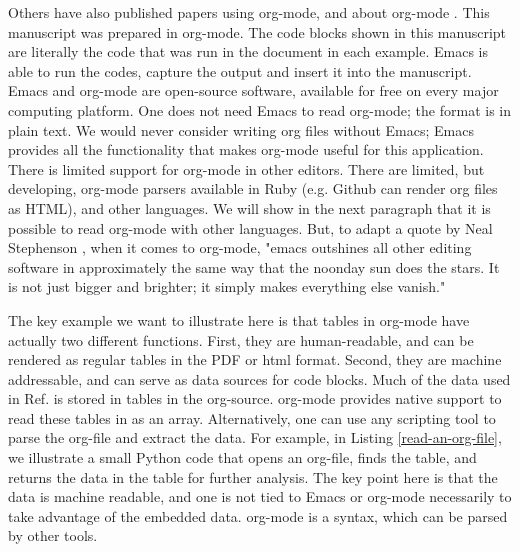 \documentclass[journal=accacs,manuscript=article,email=true]{achemso}
\begin{document}
Others have also published papers using org-mode, and about org-mode \cite{schulte-2011-activ-docum,schulte-2012-multi-languag}. This manuscript was prepared in org-mode. The code blocks shown in this manuscript are literally the code that was run in the document in each example. Emacs is able to run the codes, capture the output and insert it into the manuscript. Emacs and org-mode are open-source software, available for free on every major computing platform. One does not need Emacs to read org-mode; the format is in plain text. We would never consider writing org files without Emacs; Emacs provides all the functionality that makes org-mode useful for this application. There is limited support for org-mode in other editors. There are limited, but developing, org-mode parsers available in Ruby (e.g. Github can render org files as HTML), and other languages. We will show in the next paragraph that it is possible to read org-mode with other languages. But, to adapt a quote by Neal Stephenson \cite{Stephenson199911}, when it comes to org-mode, "emacs outshines all other editing software in approximately the same way that the noonday sun does the stars. It is not just bigger and brighter; it simply makes everything else vanish."

The key example we want to illustrate here is that tables in org-mode have actually two different functions.  First, they are human-readable, and can be rendered as regular tables in the PDF or html format. Second, they are machine addressable, and can serve as data sources for code blocks. Much of the data used in Ref.  is stored in tables in the org-source. org-mode provides native support to read these tables in as an array. Alternatively, one can use any scripting tool to parse the org-file and extract the data. For example, in Listing \ref{read-an-org-file}, we illustrate a small Python code that opens an org-file, finds the table, and returns the data in the table for further analysis. The key point here is that the data is machine readable, and one is not tied to Emacs or org-mode necessarily to take advantage of the embedded data. org-mode is a syntax, which can be parsed by other tools.
\end{document}
